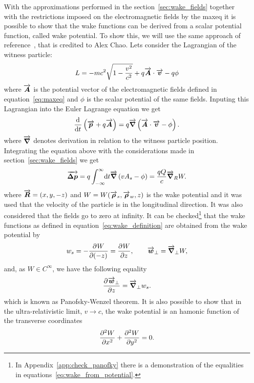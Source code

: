 \documentclass[
	12pt,				%
	openright,			%
	oneside,			%
	a4paper,		%
	chapter=TITLE,		%
	section=TITLE,		%
    brazil,				%
	english,			%
	sumario=tradicional,
	]{abntex2}
\begin{document}
  With the approximations performed in the section~\ref{sec:wake_fields} together with the restrictions imposed on the electromagnetic fields by the \gls{maxeq} it is possible to show that the wake functions can be derived from a scalar potential function, called wake potential. To show this, we will use the same approach of reference~\cite{Stupakov2000a}, that is credited to Alex Chao. Lets consider the Lagrangian of the witness particle:
  \begin{align}
  	  L = -mc^2\sqrt{1 - \frac{v^2}{c^2}} + q\vect{A}\cdot\vect{v} - q\phi
  \end{align}
  where $\vect{A}$ is the potential vector of the electromagnetic fields defined in equation~\eqref{eq:maxeq} and $\phi$ is the scalar potential of the same fields. Inputing this Lagrangian into the Euler Lagrange equation we get
  \begin{align}
	  \dertot{}{t} \left(\vect{p} + q\vect{A}\right) = q\vect{\nabla}\left( \vect{A}\cdot\vect{v} - \phi\right).
  \end{align}
  where $\vect{\nabla}$ denotes derivation in relation to the witness particle position. Integrating the equation above with the considerations made in section~\ref{sec:wake_fields} we get
  \begin{align}
   \vect{\Delta p} = q\infint{t}{\vect{\nabla}\left(vA_s - \phi \right)} = \frac{qQ}{c} \vect{\nabla}_R W.
  \end{align}
  where $\vect{R} =(x, y, -z)$ and $W = W(\vect{\rho}_s, \vect{\rho}_w, z)$ is the wake potential and it was used that the velocity of the particle is in the longitudinal direction. It was also considered that the fields go to zero at infinity. It can be checked\footnote{In Appendix~\ref{app:check_panofky} there is a demonstration of the equalities in equations~\eqref{eq:wake_from_potential}.} that the wake functions as defined in equation~\eqref{eq:wake_definition} are obtained from the wake potential by
  \begin{align}\label{eq:wake_from_potential}
   w_s = - \derpar{W}{(-z)} = \derpar{W}{z},\qquad \vect{w}_\perp = \vect{\nabla}_\perp W,
  \end{align}
  and, as $W \in C^{\infty}$, we have the following equality
  \begin{align}\label{eq:panofsky_wenzel_theorem}
   \derpar{\vect{w}_\perp}{z} = \vect{\nabla}_\perp w_s.
  \end{align}
  which is known as Panofsky-Wenzel theorem. It is also possible to show that in the ultra-relativistic limit, $v \to c$, the wake potential is an hamonic function of the transverse coordinates
  \begin{align}\label{eq:potential_harmonic}
  	  \derpar[2]{W}{x} + \derpar[2]{W}{y} = 0.
  \end{align}
\end{document}
